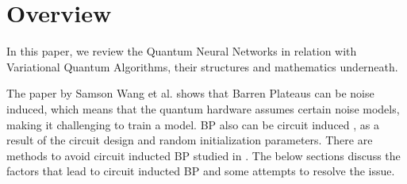\section{Overview}
In this paper, we review the Quantum Neural Networks in relation with Variational Quantum Algorithms, their structures and mathematics underneath.

The paper \cite{wangNoiseinducedBarrenPlateaus2021} by Samson Wang et al. shows that Barren Plateaus can be noise induced, which means that the quantum hardware assumes certain noise models, making it challenging to train a model. 
BP also can be circuit induced \cite{mccleanBarrenPlateausQuantum2018}, as a result of the circuit design and random initialization parameters.
There are methods to avoid circuit inducted BP studied in \cite{pesahAbsenceBarrenPlateaus2021, cerezoCostFunctionDependent2021,skolikLayerwiseLearningQuantum2021}.
The below sections discuss the factors that lead to circuit inducted BP and some attempts to resolve the issue.